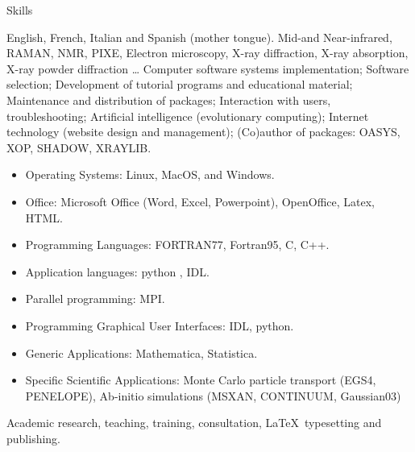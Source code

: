 \prefix{}
\begin{rubric}{Skills}


\entry*[Languages]
	English, French, Italian and Spanish (mother tongue).
	 Mid-and Near-infrared, RAMAN, NMR, PIXE, Electron microscopy, X-ray diffraction, X-ray absorption, X-ray powder diffraction \ldots
Computer software systems implementation; Software selection; Development of tutorial programs and educational material; Maintenance and distribution of packages; Interaction with users, troubleshooting; Artificial intelligence (evolutionary computing); Internet technology (website design and management); (Co)author of packages: OASYS, XOP, SHADOW, XRAYLIB.

\begin{itemize}
\item Operating Systems: Linux, MacOS, and Windows.
\item Office: Microsoft Office (Word, Excel, Powerpoint), OpenOffice, Latex, HTML.  
\item Programming Languages: FORTRAN77, Fortran95, C, C++.
\item Application languages: python , IDL.
\item Parallel programming: MPI.
\item Programming Graphical User Interfaces: IDL, python.
\item Generic Applications: Mathematica, Statistica.
\item Specific Scientific Applications: Monte Carlo particle transport (EGS4, PENELOPE), Ab-initio simulations (MSXAN, CONTINUUM, Gaussian03)
\end{itemize}
\entry*[Misc.]
	Academic research, teaching, training, consultation, \LaTeX\ typesetting and publishing.
\end{rubric}
